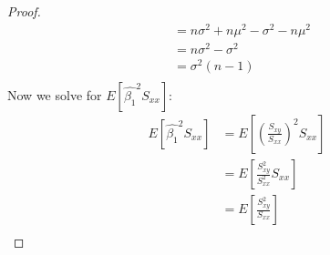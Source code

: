 \documentclass[12pt]{article}
\begin{document}
\begin{enumerate}[1.]
\begin{proof}
\begin{align*}
                &= n\sigma^2 + n\mu^2 - \sigma^2 - n\mu^2 \\ 
                &= n\sigma^2 - \sigma^2 \\ 
                &= \sigma^2(n - 1) \\ 
            \end{align*}
            Now we solve for $E[\hat{\beta_1}^2 S_{xx}]$:
            \begin{align*}
                E[\hat{\beta_1}^2 S_{xx}] &= E[\left(\frac{S_{xy}}{S_{xx}}\right)^2 S_{xx}] \\
                &= E[\frac{S_{xy}^2}{S_{xx}^2} S_{xx}] \\
                &= E[\frac{S_{xy}^2}{S_{xx}}] \\
            \end{align*}
        \end{proof}
\end{enumerate}
\end{document}
